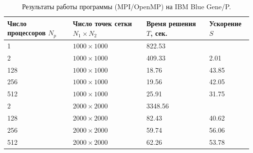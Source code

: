 \documentclass[11pt]{article}
\numberwithin{equation}{section}
\theoremstyle{plain}
\theoremstyle{definition}
\begin{document}
\begin{table}[h]
\centering
\begin{tabular}{|l|l|l|l|}\hline
Число процессоров $N_p$ & Число точек сетки $N_1 \times N_2$ & Время решения $T$, сек. & Ускорение $S$ \\ \hline
1                       & $1000 \times 1000$                 & 822.53                  &               \\
2                       & $1000 \times 1000$                 & 409.33                  & 2.01          \\
128                     & $1000 \times 1000$                 & 18.76                   & 43.85         \\
256                     & $1000 \times 1000$                 & 19.56                   & 42.05         \\
512                     & $1000 \times 1000$                 & 25.91                   & 31.75         \\ \hline
2                       & $2000 \times 2000$                 & 3348.56                 &               \\
128                     & $2000 \times 2000$                 & 82.43                   & 40.62         \\
256                     & $2000 \times 2000$                 & 59.74                   & 56.06         \\
512                     & $2000 \times 2000$                 & 62.26                   & 53.78         \\ \hline
\end{tabular}
    \caption{Результаты работы программы (MPI/OpenMP) на IBM Blue Gene/P.}
\label{tab_openmp}
\end{table}
\end{document}
